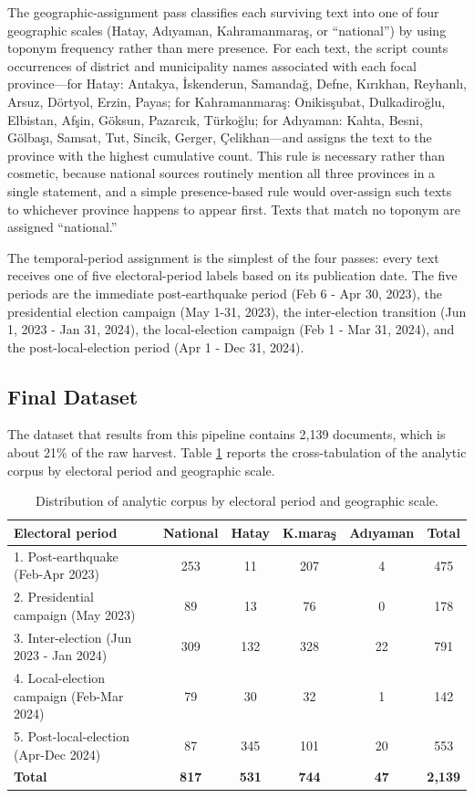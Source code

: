 \documentclass[12pt, journal]{IEEEtran}
\begin{document}
The geographic-assignment pass classifies each surviving text into one of four geographic scales (Hatay, Ad\i yaman, Kahramanmara\c{s}, or ``national'') by using toponym frequency rather than mere presence. For each text, the script counts occurrences of district and municipality names associated with each focal province---for Hatay: Antakya, \.{I}skenderun, Samanda\u{g}, Defne, K\i r\i khan, Reyhanl\i, Arsuz, D\"ortyol, Erzin, Payas; for Kahramanmara\c{s}: Onikis\c{s}ubat, Dulkadiro\u{g}lu, Elbistan, Af\c{s}in, G\"oksun, Pazarc\i k, T\"urko\u{g}lu; for Ad\i yaman: Kahta, Besni, G\"olba\c{s}\i, Samsat, Tut, Sincik, Gerger, \c{C}elikhan---and assigns the text to the province with the highest cumulative count. This rule is necessary rather than cosmetic, because national sources routinely mention all three provinces in a single statement, and a simple presence-based rule would over-assign such texts to whichever province happens to appear first. Texts that match no toponym are assigned ``national.''

The temporal-period assignment is the simplest of the four passes: every text receives one of five electoral-period labels based on its publication date. The five periods are the immediate post-earthquake period (Feb 6 - Apr 30, 2023), the presidential election campaign (May 1-31, 2023), the inter-election transition (Jun 1, 2023 - Jan 31, 2024), the local-election campaign (Feb 1 - Mar 31, 2024), and the post-local-election period (Apr 1 - Dec 31, 2024).

\subsection{Final Dataset}
The dataset that results from this pipeline contains 2,139 documents, which is about 21\% of the raw harvest. Table \ref{table_corpus} reports the cross-tabulation of the analytic corpus by electoral period and geographic scale.

\begin{table}[!ht]
\renewcommand{\arraystretch}{1.3}
\caption{Distribution of analytic corpus by electoral period and geographic scale.}
\label{table_corpus}
\centering
\begin{tabular}{|l|c|c|c|c|c|}
\hline
\textbf{Electoral period} & \textbf{National} & \textbf{Hatay} & \textbf{K.mara\c{s}} & \textbf{Ad\i yaman} & \textbf{Total} \\
\hline\hline
1. Post-earthquake (Feb-Apr 2023) & 253 & 11 & 207 & 4 & 475 \\
\hline
2. Presidential campaign (May 2023) & 89 & 13 & 76 & 0 & 178 \\
\hline
3. Inter-election (Jun 2023 - Jan 2024) & 309 & 132 & 328 & 22 & 791 \\
\hline
4. Local-election campaign (Feb-Mar 2024) & 79 & 30 & 32 & 1 & 142 \\
\hline
5. Post-local-election (Apr-Dec 2024) & 87 & 345 & 101 & 20 & 553 \\
\hline\hline
\textbf{Total} & \textbf{817} & \textbf{531} & \textbf{744} & \textbf{47} & \textbf{2,139} \\
\hline
\end{tabular}
\end{table}
\end{document}

